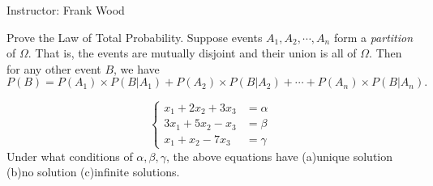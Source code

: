 \documentclass[12pt]{article}
\begin{document}
 \begin{center}
  Instructor: Frank Wood 
 \end{center}
\studentinfo
{}
\finishfirstpage



{
Prove the Law of Total Probability. Suppose events $A_1, A_2, \cdots, A_n$ form a \emph{partition} of $\Omega$. That is, the events are mutually disjoint and their union is all of $\Omega$. Then for any other event $B$, we have
$$P(B)=P(A_1)\times P(B|A_1)+P(A_2)\times P(B|A_2)+\cdots+P(A_n)\times P(B|A_n).$$
}
{

\vfill
 \newpage

}
{
}

%
%
%
%
%

{
\[
\left\{
\begin{array}{ccc}
 x_1 + 2x_2 + 3x_3 &= \alpha  \\
 3x_1 + 5x_2 - x_3 &= \beta \\
 x_1 + x_2 - 7x_3 &= \gamma
\end{array}
\right.
\]
Under what conditions of $\alpha,\beta,\gamma$, the above equations have (a)unique solution (b)no solution (c)infinite solutions.
}
{

\vfill
 \newpage

}
{
}
\end{document}
